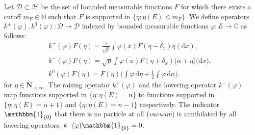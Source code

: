 \documentclass[10pt,a4paper]{amsart}
\numberwithin{equation}{section}
\newcommand{\N}{\mathbb{N}}
\newcommand{\C}{\mathbb{C}}
\newcommand{\dd}{\mathrm{d}} %
\newcommand{\1}{\mathbbm{1}}
\begin{document}
Let $\mathcal D\subset \mathcal H$ be the set of bounded measurable functions $F$ for which there exists a cutoff $ m_F \in \N$ such that $F$ is supported in $\{\eta\colon \eta(E)\leq m_F\}$. We define operators $k^\pm(\varphi),k^0(\varphi)\colon\mathcal D\to \mathcal D$ indexed by bounded measurable functions $\varphi\colon E\to \C$ as follows:
\begin{align*}
	&k^+(\varphi) F(\eta) = \frac{1}{\sqrt p} \int \varphi(x) F(\eta-\delta_x) \eta(\dd x),\\
 &k^-(\varphi) F(\eta) = \sqrt{p} \int \overline{\varphi(x)} F(\eta+\delta_x) \bigl(\alpha+\eta)\bigr(\dd x),\\
	&k^0(\varphi) F(\eta) = F(\eta) \biggl( \int \varphi\,\dd \eta+ \frac12 \int \varphi \,\dd \alpha \biggr).
\end{align*}
for $\eta \in \mathbf{N}_{<\infty}$.
The raising operator $k^+(\varphi)$ and the lowering operator $k^-(\varphi)$ map functions supported in $\{\eta\colon \eta(E) = n\}$ to functions supported in $\{\eta\colon \eta(E) =n+1\}$ and $\{\eta\colon \eta(E) =n-1\}$ respectively. The indicator $\1_{\{0\}}$ that there is no particle at all (\emph{vacuum}) is annihilated by all lowering operators: $k^-(\varphi) \1_{\{0\}}=0$.
\end{document}
